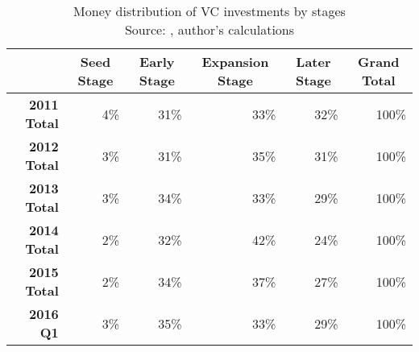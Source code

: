\begin{table}[!htbp]
    \hspace*{-1.5cm}
    \centering
    \begin{tabular}{rrrrrr}
    \multicolumn{1}{c}{} & \multicolumn{1}{c}{\textbf{Seed Stage}} & \multicolumn{1}{c}{\textbf{Early Stage}} & \multicolumn{1}{c}{\textbf{Expansion Stage}} & \multicolumn{1}{c}{\textbf{Later Stage}} & \multicolumn{1}{c}{\textbf{Grand Total}} \\ \hline
    \textbf{2011 Total}  & 4\%                                     & 31\%                                     & 33\%                                         & 32\%                                     & 100\%                                    \\ \hline
    \textbf{2012 Total}  & 3\%                                     & 31\%                                     & 35\%                                         & 31\%                                     & 100\%                                    \\ \hline
    \textbf{2013 Total}  & 3\%                                     & 34\%                                     & 33\%                                         & 29\%                                     & 100\%                                    \\ \hline
    \textbf{2014 Total}  & 2\%                                     & 32\%                                     & 42\%                                         & 24\%                                     & 100\%                                    \\ \hline
    \textbf{2015 Total}  & 2\%                                     & 34\%                                     & 37\%                                         & 27\%                                     & 100\%                                    \\ \hline
    \textbf{2016 Q1}  & 3\%                                     & 35\%                                     & 33\%                                         & 29\%                                     & 100\%                                   
    \end{tabular}
    \caption{Money distribution of VC investments by stages\\Source: \parencite{moneytree}, author's calculations}
    \label{tab:vc_stage_usd}
    \hspace*{-1.2cm}
\end{table}





